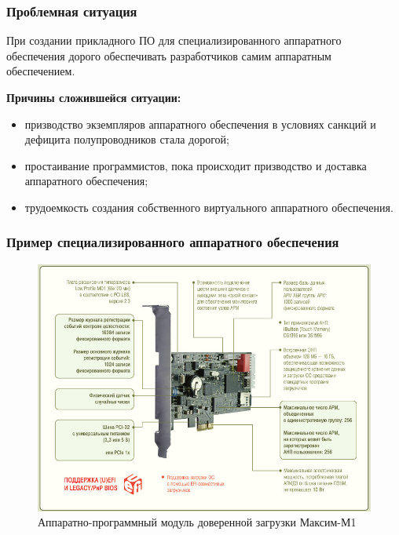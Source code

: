 \begin{frame}%
    \frametitle{Проблемная ситуация}

    При создании прикладного ПО для специализированного аппаратного обеспечения
    дорого обеспечивать разработчиков самим аппаратным обеспечением.

    \textbf{Причины сложившейся ситуации:}
    \begin{itemize}
        \item призводство экземпляров аппаратного обеспечения в условиях санкций и дефицита полупроводников стала дорогой;
        \item простаивание программистов, пока происходит призводство и доставка аппаратного обеспечения;
        \item трудоемкость создания собственного виртуального аппаратного обеспечения.
    \end{itemize}
\end{frame}


\begin{frame}%
    \frametitle{Пример специализированного аппаратного обеспечения}
    \begin{figure}[!htbp]
        \centering
        \begin{adjustbox}{max totalsize={0.8\textwidth}{0.8\textheight}}
            \includegraphics[]{images/apmdz.png}
        \end{adjustbox}
        \caption{Аппаратно-программный модуль доверенной загрузки Максим-М1}
    \end{figure}
\end{frame}


